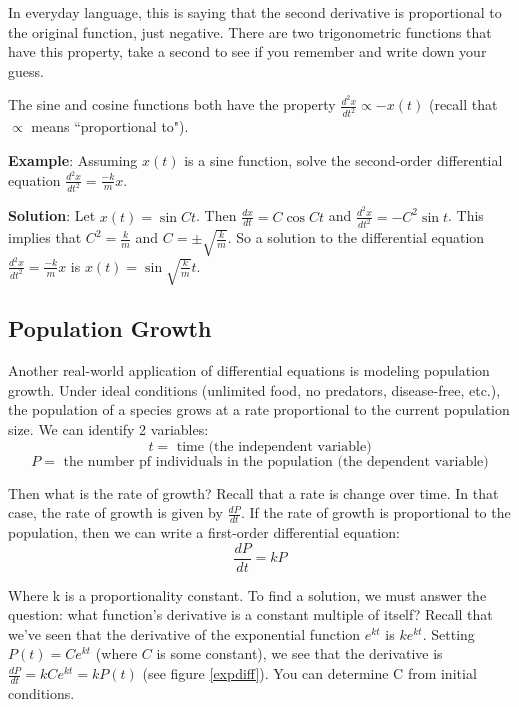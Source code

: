 In everyday language, this is saying that the second derivative is proportional 
to the original function, just negative. There are two trigonometric functions 
that have this property, take a second to see if you remember and write down 
your guess. 

The sine and cosine functions both have the property $\frac{d^2x}{dt^2} \propto 
-x(t)$ (recall that $\propto$ means ``proportional to"). 

\textbf{Example}: Assuming $x(t)$ is a sine function, solve the second-order 
differential equation $\frac{d^2x}{dt^2} = \frac{-k}{m}x$.

\textbf{Solution}: Let $x(t) = \sin{Ct}$. Then $\frac{dx}{dt} = C\cos{Ct}$ and 
$\frac{d^2x}{dt^2} = -C^2\sin{t}$. This implies that $C^2 = \frac{k}{m}$ and 
$C = \pm \sqrt{\frac{k}{m}}$. So a solution to the differential equation 
$\frac{d^2x}{dt^2} = \frac{-k}{m}x$ is $x(t) = \sin{\sqrt{\frac{k}{m}}t}$. 

\subsection{Population Growth}
Another real-world application of differential equations is modeling population 
growth. Under ideal conditions (unlimited food, no predators, disease-free, 
etc.), the population of a species grows at a rate proportional to the current 
population size. We can identify 2 variables:
$$t = \text{ time (the independent variable)}$$
$$P = \text{ the number pf individuals in the population (the dependent 
variable)}$$

Then what is the rate of growth? Recall that a rate is change over time. In 
that case, the rate of growth is given by $\frac{dP}{dt}$. If the rate of 
growth is proportional to the population, then we can write a first-order 
differential equation:
$$\frac{dP}{dt} = kP$$

Where k is a proportionality constant. To find a solution, we must answer the 
question: what function's derivative is a constant multiple of itself? Recall 
that we've seen that the derivative of the exponential function $e^{kt}$ is 
$ke^{kt}$. Setting $P(t) = Ce^{kt}$ (where $C$ is some constant), we see that 
the derivative is $\frac{dP}{dt} = kCe^{kt} = kP(t)$ (see figure 
\ref{expdiff}). You can determine C from initial conditions. 

